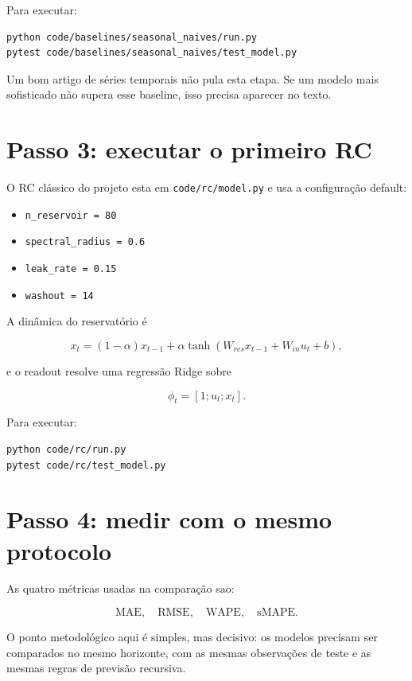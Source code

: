 \documentclass[12pt]{article}
\providecommand{\tightlist}{%
              \setlength{\itemsep}{0pt}\setlength{\parskip}{0pt}}
\begin{document}
Para executar:

\begin{verbatim}
python code/baselines/seasonal_naives/run.py
pytest code/baselines/seasonal_naives/test_model.py
\end{verbatim}

Um bom artigo de séries temporais não pula esta etapa. Se um modelo mais sofisticado não supera esse baseline, isso precisa aparecer no texto.

\section{Passo 3: executar o primeiro RC}\label{5-passo-3-executar-o-primeiro-rc}

O RC clássico do projeto esta em \texttt{code/rc/model.py} e usa a configuração default:

\begin{itemize}
\tightlist
\item
  \texttt{n\_reservoir\ =\ 80}
\item
  \texttt{spectral\_radius\ =\ 0.6}
\item
  \texttt{leak\_rate\ =\ 0.15}
\item
  \texttt{washout\ =\ 14}
\end{itemize}

A dinâmica do reservatório é

\[
x_t = (1 - \alpha) x_{t-1} + \alpha \tanh(W_{res} x_{t-1} + W_{in} u_t + b),
\]

e o readout resolve uma regressão Ridge sobre

\[
\phi_t = [1; u_t; x_t].
\]

Para executar:

\begin{verbatim}
python code/rc/run.py
pytest code/rc/test_model.py
\end{verbatim}

\section{Passo 4: medir com o mesmo protocolo}\label{6-passo-4-medir-com-o-mesmo-protocolo}

As quatro métricas usadas na comparação sao:

\[
\mathrm{MAE},\quad \mathrm{RMSE},\quad \mathrm{WAPE},\quad \mathrm{sMAPE}.
\]

O ponto metodológico aqui é simples, mas decisivo: os modelos precisam ser comparados no mesmo horizonte, com as mesmas observações de teste e as mesmas regras de previsão recursiva.
\end{document}
